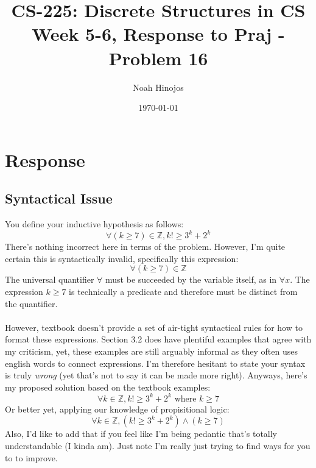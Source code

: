 \documentclass[12pt]{article}
\title{
  \textbf{CS-225: Discrete Structures in CS} \\
  Week 5-6, Response to Praj - Problem 16 
  }
\author{Noah Hinojos}
\date{\today}
\begin{document}
\maketitle
\section*{Response}
\subsection*{Syntactical Issue}
You define your inductive hypothesis as follows:
$$\forall(k \geq 7)\in \mathbb{Z}, k! \geq 3^k + 2^k$$
There's nothing incorrect here in terms of the problem. 
However, I'm quite certain this is syntactically invalid, specifically this expression:
$$\forall(k \geq 7) \in \mathbb{Z}$$
The universal quantifier $\forall$ must be succeeded by the variable itself, as in $\forall x$.
The expression $k \geq 7$ is technically a predicate and therefore must be distinct from the quantifier.
\\ \\
However, textbook doesn't provide a set of air-tight syntactical rules for how to format these expressions. 
Section 3.2 does have plentiful examples that agree with my criticism, yet, these examples are still arguably informal as they often uses english words to connect expressions. 
I'm therefore hesitant to state your syntax is truly \textit{wrong} (yet that's not to say it can be made more right). 
Anyways, here's my proposed solution based on the textbook examples:
$$\forall k \in \mathbb{Z},k! \geq 3^k + 2^k \text{ where } k \geq 7$$
Or better yet, applying our knowledge of propisitional logic:
$$\forall k \in \mathbb{Z},(k! \geq 3^k + 2^k) \wedge (k \geq 7)$$
Also, I'd like to add that if you feel like I'm being pedantic that's totally understandable (I kinda am). Just note I'm really just trying to find ways for you to to improve.
\end{document}
